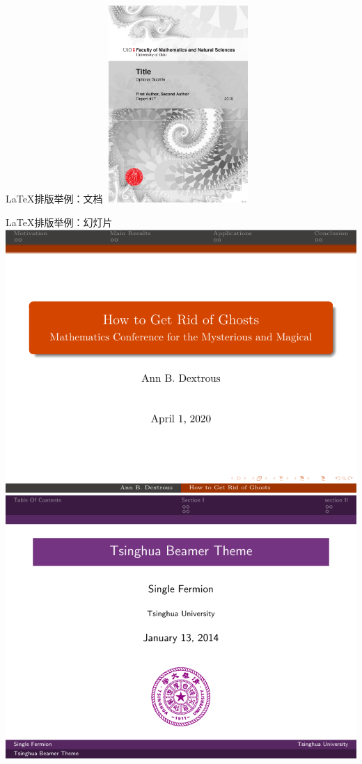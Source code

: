 \documentclass[UTF8,11pt]{ctexbeamer}
\begin{document}
\begin{frame}{\LaTeX 排版举例：文档}
	\centering
	\includegraphics[width=5.5cm,height=7.5cm]{figure/book}
\end{frame}


\begin{frame}{\LaTeX 排版举例：幻灯片}
	\includegraphics[scale=0.45]{figure/examplebeamer1}
	\includegraphics[scale=0.45]{figure/examplebeamer2}
\end{frame}
\end{document}
